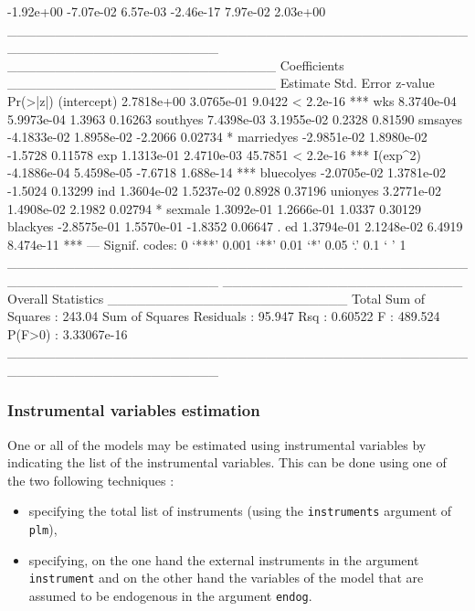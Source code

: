 \documentclass{article}
\begin{document}
\begin{Schunk}
\begin{Soutput}
-1.92e+00 -7.07e-02  6.57e-03 -2.46e-17  7.97e-02  2.03e+00 
______________________________________________________________________ 
____________________________ Coefficients ____________________________
               Estimate  Std. Error z-value  Pr(>|z|)    
(intercept)  2.7818e+00  3.0765e-01  9.0422 < 2.2e-16 ***
wks          8.3740e-04  5.9973e-04  1.3963   0.16263    
southyes     7.4398e-03  3.1955e-02  0.2328   0.81590    
smsayes     -4.1833e-02  1.8958e-02 -2.2066   0.02734 *  
marriedyes  -2.9851e-02  1.8980e-02 -1.5728   0.11578    
exp          1.1313e-01  2.4710e-03 45.7851 < 2.2e-16 ***
I(exp^2)    -4.1886e-04  5.4598e-05 -7.6718 1.688e-14 ***
bluecolyes  -2.0705e-02  1.3781e-02 -1.5024   0.13299    
ind          1.3604e-02  1.5237e-02  0.8928   0.37196    
unionyes     3.2771e-02  1.4908e-02  2.1982   0.02794 *  
sexmale      1.3092e-01  1.2666e-01  1.0337   0.30129    
blackyes    -2.8575e-01  1.5570e-01 -1.8352   0.06647 .  
ed           1.3794e-01  2.1248e-02  6.4919 8.474e-11 ***
---
Signif. codes:  0 ‘***’ 0.001 ‘**’ 0.01 ‘*’ 0.05 ‘.’ 0.1 ‘ ’ 1 
______________________________________________________________________ 
_________________________ Overall Statistics _________________________
Total Sum of Squares       : 243.04
Sum of Squares Residuals   : 95.947
Rsq                        : 0.60522
F                          : 489.524
P(F>0)                     : 3.33067e-16
______________________________________________________________________ 
\end{Soutput}
\end{Schunk}

\subsubsection{Instrumental variables estimation}

One or all of the models may be estimated using instrumental variables
by indicating the list of the instrumental variables. This can be done
using one of the two following techniques :

\begin{itemize}
\item specifying the total list of instruments  (using the
  \texttt{instruments} argument of \texttt{plm}),
\item specifying, on the one hand the external instruments in the argument
  \texttt{instrument} and on  the other hand the variables of the
  model that are assumed to be endogenous in the argument \texttt{endog}.
\end{itemize}
\end{document}
